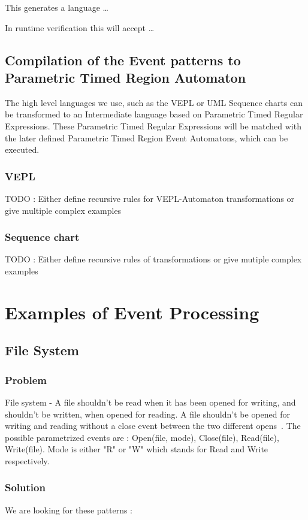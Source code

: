 			
			
			
			This generates a language \dots %
				
			In runtime verification this will accept \dots %
				
			
		

		\subsection{Compilation of the Event patterns to Parametric Timed Region Automaton}
				The high level languages we use, such as the VEPL or UML Sequence charts can be transformed to an Intermediate language based on Parametric Timed Regular Expressions.
				These Parametric Timed Regular Expressions will be matched with the later defined Parametric Timed Region Event Automatons, which can be executed.

			\subsubsection{VEPL}
				TODO : Either define recursive rules for VEPL-Automaton transformations or give multiple complex examples 
			\subsubsection{Sequence chart}
				TODO : Either define recursive rules of transformations  or give mutiple complex examples
			
	\section{Examples of Event Processing}
 
 
		\subsection{File System}
			\subsubsection{Problem}
				File system - A file shouldn't be read when it has been opened for writing, and shouldn't be written, when opened for reading. 
				A file shouldn't be opened for writing and reading without a close event between the two different opens~\citep{marq}.
				The possible parametrized events are : 
				Open(file, mode), 
				Close(file), 
				Read(file), 
				Write(file). 
				Mode is either "R" or "W" which stands for Read and Write respectively.
			\subsubsection{Solution}
				We are looking for these patterns :


